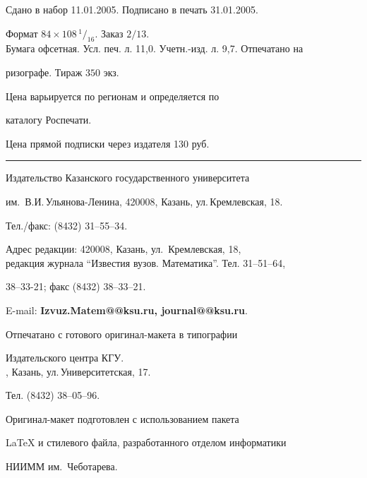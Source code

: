 \noindent Сдано в набор 11.01.2005. Подписано в печать 31.01.2005.


Формат $84\times 108 \,^1/_{16}.$ Заказ $2/13$.\\


Бумага офсетная. Усл. печ. л. 11,0. Учетн.-изд. л. 9,7. Отпечатано на 


ризографе. Тираж $350$ экз. 





\noindent Цена варьируется по регионам и определяется по 


каталогу Роспечати. 





\noindent Цена прямой подписки через издателя 130 руб. 


\bigskip


\hrule


\bigskip


\noindent Издательство Казанского государственного университета


им.~В.И.\,Ульянова-Ленина, 420008, Казань, ул.\,Кремлевская, 18.


Тел./факс: (8432) 31--55--34.\\


\smallskip





\noindent Адрес редакции: 420008, Казань, ул.~Кремлевская, 18,\\  


редакция журнала  ``Известия вузов. Математика''. Тел. 31--51--64,


38--33-21; факс (8432) 38--33--21.





\noindent E-mail: {\bf Izvuz.Matem@@ksu.ru, journal@@ksu.ru}. \par


\bigskip 


\noindent Отпечатано с готового оригинал-макета в типографии


Издательского центра КГУ. \\





, Казань, ул.\,Университетская, 17.


Тел. (8432) 38--05--96. \par


\bigskip


\noindent Оригинал-макет подготовлен с использованием пакета


\AmS\LaTeX{} и стилевого файла, разработанного отделом информатики


НИИММ им.~Чеботарева.








